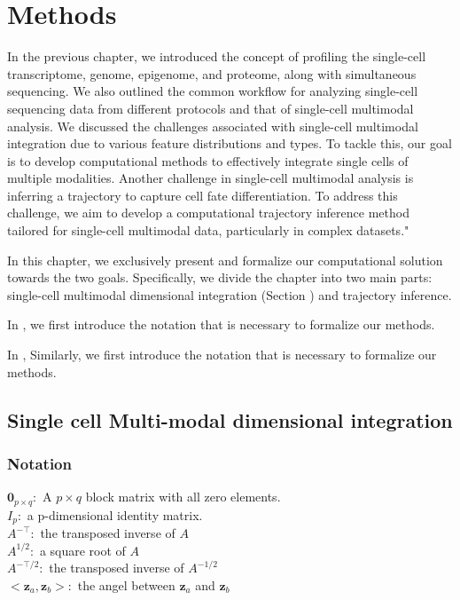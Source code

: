 %
\chapter{Methods}
\label{chapter:methods}
\graphicspath{{chapter3/figs}}

In the previous chapter, we introduced the concept of profiling the single-cell transcriptome, genome, epigenome, and proteome, along with simultaneous sequencing. We also outlined the common workflow for analyzing single-cell sequencing data from different protocols and that of single-cell multimodal analysis. We discussed the challenges associated with single-cell multimodal integration due to various feature distributions and types. To tackle this, our goal is to develop computational methods to effectively integrate single cells of multiple modalities. Another challenge in single-cell multimodal analysis is inferring a trajectory to capture cell fate differentiation. To address this challenge, we aim to develop a computational trajectory inference method tailored for single-cell multimodal data, particularly in complex datasets."

In this chapter, we exclusively present and formalize our computational solution towards the two goals. Specifically, we divide the chapter into two main parts: single-cell multimodal dimensional integration (Section ) and trajectory inference.

In , we first introduce the notation that is necessary to formalize our methods.

In , Similarly, we first introduce the notation that is necessary to formalize our methods.


\section{Single cell Multi-modal dimensional integration}
\label{methods:integration}
\subsection{Notation}
$\mathbf{0}_{p\times q}: $ A $p\times q$ block matrix with all zero elements.\\
$I_p:$ a p-dimensional identity matrix.\\
$A^{-\top}:$ the transposed inverse of $A$\\
$A^{1/2}:$ a square root of $A$\\
$A^{-\top/2}:$ the transposed inverse of $A^{-1/2}$\\
$<\mathbf{z}_a, \mathbf{z}_b>:$ the angel between $\mathbf{z}_a$ and $\mathbf{z}_b$

